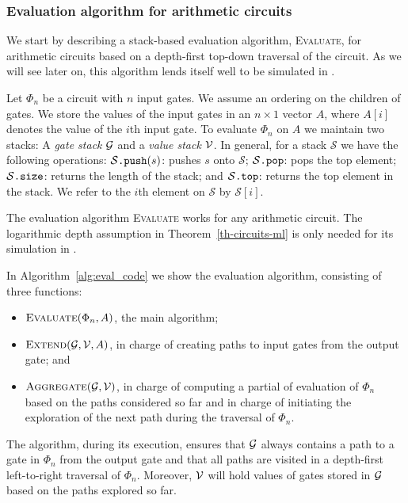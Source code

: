 \subsubsection{Evaluation algorithm for arithmetic circuits}\label{subsubsec:eval}
We start by describing a stack-based evaluation algorithm, \textsc{Evaluate}, for arithmetic circuits based on a depth-first top-down traversal of the circuit. As we will see later on, this algorithm lends itself well to be simulated in \langfor. 

Let $\Phi_n$ be a circuit with $n$ input gates. We assume an ordering on the children of gates.
We store the values of the input gates in an $n\times 1$ vector $A$, where $A[i]$ denotes the value
of the $i$th input gate. To evaluate $\Phi_n$ on $A$ we  maintain two stacks: A \textit{gate stack}
 $\mathcal{G}$ and a \textit{value stack} $\mathcal{V}$. In general, for a stack $\mathcal S$ we have the following operations: $\mathcal S\texttt{.push}(s)$: pushes $s$ onto $\mathcal S$;
$\mathcal S\texttt{.pop}$: pops the top element;  $\mathcal S\texttt{.size}$: returns the length of the stack; and
$\mathcal S\texttt{.top}$: returns the top element in the stack. We refer to the $i$th element on $\mathcal S$ by $\mathcal S[i]$.


\smallskip
The evaluation algorithm \textsc{Evaluate} works for any arithmetic circuit. The logarithmic depth assumption in Theorem~\ref{th-circuits-ml} is only needed for its simulation in \langfor.

In Algorithm~\ref{alg:eval_code} we show the evaluation algorithm, consisting of three functions:
\begin{itemize}
\item $\textsc{Evaluate}(\Phi_n,A)$, the main algorithm; 
\item $\textsc{Extend}(\mathcal{G},\mathcal{V},A)$, in charge of creating paths to input gates from the output gate; and 
\item $\textsc{Aggregate}(\mathcal{G},\mathcal{V})$, in charge of computing a partial of evaluation of $\Phi_n$ based on the paths considered so far and in charge of initiating the exploration of the next path during the traversal of $\Phi_n$.
\end{itemize}
The algorithm, during its execution, ensures that 
$\mathcal{G}$ always contains a path to a gate in $\Phi_n$ from the output gate and that all paths are visited in a depth-first left-to-right traversal of $\Phi_n$. Moreover, $\mathcal{V}$ will hold values of gates stored in $\mathcal{G}$ based on the paths explored so far.



